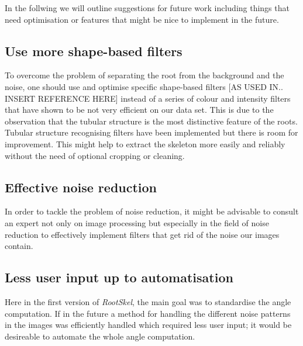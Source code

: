 In the follwing we will outline suggestions for future work including things that need optimisation or features that might be nice to implement in the future. 


\subsection{Use more shape-based filters}

To overcome the problem of separating the root from the background and the noise, one should use and optimise specific shape-based filters [AS USED IN.. INSERT REFERENCE HERE] instead of a series of colour and intensity filters that have shown to be not very efficient on our data set. This is due to the observation that the tubular structure is the most distinctive feature of the roots. Tubular structure recognising filters have been implemented but there is room for improvement. This might help to extract the skeleton more easily and reliably without the need of optional cropping or cleaning.


\subsection{Effective noise reduction}

In order to tackle the problem of noise reduction, it might be advisable to consult an expert not only on image processing but especially in the field of noise reduction to effectively implement filters that get rid of the noise our images contain. 



\subsection{Less user input up to automatisation}

Here in the first version of \textit{RootSkel}, the main goal was to standardise the angle computation. If in the future  a method for handling the different noise patterns in the images was efficiently handled which required less user input; it would be desireable to automate the whole angle computation.

 
